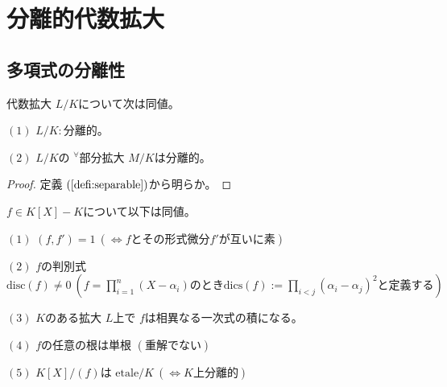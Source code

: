 \documentclass[../master_galois_theory]{subfiles}
\begin{document}
\setcounter{section}{8}

\section{分離的代数拡大}

\subsection{多項式の分離性}

\begin{prop}
  代数拡大 $L/K$について次は同値。

  $(1)$
  $L/K:$分離的。

  $(2)$
  $L/K$の ${}^\forall$部分拡大 $M/K$は分離的。
\end{prop}

\begin{proof}
  定義 $(\mathrm{\ref{defi:separable}})$から明らか。
\end{proof}

\begin{prop} \label{prop:9.2}
  $f \in K[X] - K$について以下は同値。

  $(1)$
  $(f , f') = 1 \  (\Leftrightarrow f とその形式微分 f' が互いに素)$

  $(2)$
  $f$の判別式 $\mathrm{disc}(f) \neq 0 \  ( f = \prod_{i = 1}^n (X - \alpha_i) のとき \mathrm{dics}(f) := \prod_{i < j}(\alpha_i - \alpha_j)^2 と定義する)$

  $(3)$
  $K$のある拡大 $L$上で $f$は相異なる一次式の積になる。

  $(4)$
  $f$の任意の根は単根 $(重解でない)$

  $(5)$
  $K[X]/(f)$は $\mathrm{etale}/K \  (\Leftrightarrow K上分離的)$
\end{prop}
\end{document}
